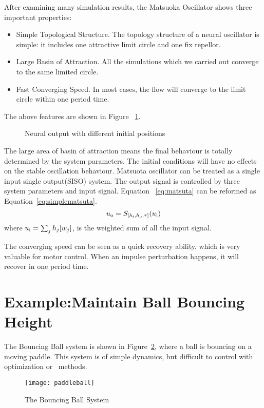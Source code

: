 After examining many simulation results, the Matsuoka Oscillator shows three important properties:
\begin{itemize}
\item{Simple Topological Structure.}
The topology structure of a neural oscillator is simple: 
it includes one  attractive limit circle and one fix repellor.
\item{Large Basin of Attraction.}
All the simulations which we carried out converge to the same limited circle.
\item{Fast Converging Speed.}
In most  cases, the flow will converge to the limit circle within one period time.
\end{itemize}


The above features are shown in Figure ~\ref{fig:neuraldiffinit}.




\begin{figure}[h]
\begin{center}
	
\end{center}
\caption{Neural output with different initial positions}
\label{fig:neuraldiffinit}
\end{figure}


 
The large area of basin of attraction means the final behaviour is totally determined by the system parameters. 
The initial conditions will have no effects on the stable oscillation behaviour. 
Matsuota oscillator can be treated as a single input single output(SISO) system.
The output signal is controlled by three system parameters and input signal. 
Equation ~\ref{eq:matsuta} can be reformed as Equation~\ref{eq:simplematsuta}.
\begin{equation}
u_{\mathrm{o}}=S_{[h_{\mathrm{i}},h_{\mathrm{o}},\tau]}(u_{\mathrm{i}})
\label{eq:simplematsuta}
\end{equation}
where $u_{\mathrm{i}}=\sum_{j}h_{j}[w_{j}]$, is the weighted sum of all the input signal.

The converging speed can be seen as a quick recovery ability, which is very valuable for motor control.
When an impulse perturbation happens, it will recover in one period time.


\section{Example:Maintain Ball Bouncing Height}
\label{sec:qualyexample}
The Bouncing Ball system is shown in Figure~\ref{fig:bball}, where a ball is bouncing on a moving paddle.
This system is of simple dynamics, but difficult to control with optimization or \pd\ methods.
\begin{figure}
\begin{center}
\texttt{[image: paddleball]}
\end{center}
\caption{The Bouncing Ball System}
\label{fig:bball}
\end{figure}
 
